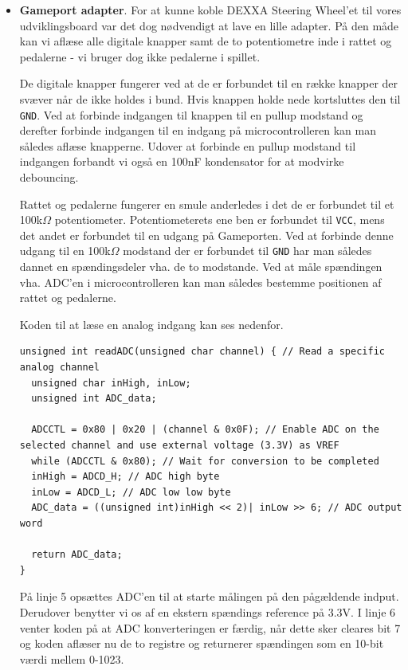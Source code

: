 \begin{itemize}
\item \textbf{Gameport adapter}. For at kunne koble DEXXA Steering Wheel'et til vores udviklingsboard var det dog nødvendigt at lave en lille adapter. På den måde kan vi aflæse alle digitale knapper samt de to potentiometre inde i rattet og pedalerne - vi bruger dog ikke pedalerne i spillet.

De digitale knapper fungerer ved at de er forbundet til en række knapper der svæver når de ikke holdes i bund. Hvis knappen holde nede kortsluttes den til \texttt{GND}. Ved at forbinde indgangen til knappen til en pullup modstand og derefter forbinde indgangen til en indgang på microcontrolleren kan man således aflæse knapperne. Udover at forbinde en pullup modstand til indgangen forbandt vi også en 100nF kondensator for at modvirke debouncing.

Rattet og pedalerne fungerer en smule anderledes i det de er forbundet til et 100k$\Omega$ potentiometer. Potentiometerets ene ben er forbundet til \texttt{VCC}, mens det andet er forbundet til en udgang på Gameporten. Ved at forbinde denne udgang til en 100k$\Omega$ modstand der er forbundet til \texttt{GND} har man således dannet en spændingsdeler vha. de to modstande. Ved at måle spændingen vha. ADC'en i microcontrolleren kan man således bestemme positionen af rattet og pedalerne.

Koden til at læse en analog indgang kan ses nedenfor.

\begin{lstlisting}
unsigned int readADC(unsigned char channel) { // Read a specific analog channel
  unsigned char inHigh, inLow;
  unsigned int ADC_data;
  
  ADCCTL = 0x80 | 0x20 | (channel & 0x0F); // Enable ADC on the selected channel and use external voltage (3.3V) as VREF
  while (ADCCTL & 0x80); // Wait for conversion to be completed
  inHigh = ADCD_H; // ADC high byte
  inLow = ADCD_L; // ADC low low byte
  ADC_data = ((unsigned int)inHigh << 2)| inLow >> 6; // ADC output word
  
  return ADC_data;
}
\end{lstlisting}

På linje 5 opsættes ADC'en til at starte målingen på den pågældende indput. Derudover benytter vi os af en ekstern spændings reference på 3.3V. I linje 6 venter koden på at ADC konverteringen er færdig, når dette sker cleares bit 7 og koden aflæser nu de to registre og returnerer spændingen som en 10-bit værdi mellem 0-1023.


\end{itemize}
